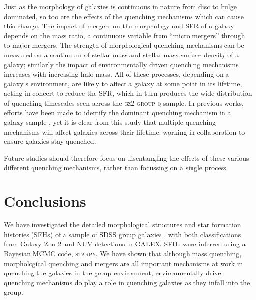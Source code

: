 \documentclass[useAMS,usenatbib]{mn2e}
\begin{document}
Just as the morphology of galaxies is continuous in nature from disc to bulge dominated, so too are the effects of the quenching mechanisms which can cause this change. The impact of mergers on the morphology and SFR of a galaxy depends on the mass ratio, a continuous variable from ``micro mergers'' \citep{beaton14, carlin16} through to major mergers. The strength of morphological quenching mechanisms can be measured on a continuum of stellar mass and stellar mass surface density of a galaxy; similarly the impact of environmentally driven quenching mechanisms increases with increasing halo mass. All of these processes, depending on a galaxy's environment, are likely to affect a galaxy at some point in its lifetime, acting in concert to reduce the SFR, which in turn produces the wide distribution of quenching timescales seen across the \textsc{gz2-group-q} sample. In previous works, efforts have been made to identify the dominant quenching mechanism in a galaxy sample \citep[e.g.][]{muzzin12, schawinski14, foltz15, woo15, balogh16, darvish16, huertascompany16}, yet it is clear from this study that multiple quenching mechanisms will affect galaxies across their lifetime, working in collaboration to ensure galaxies stay quenched. 

Future studies should therefore focus on disentangling the effects of these various different quenching mechanisms, rather than focussing on a single process. 

\section{Conclusions}\label{sec:conc}

We have investigated the detailed morphological structures and star formation histories (SFHs) of a sample of SDSS group galaxies \citep{berlind06}, with both classifications from Galaxy Zoo 2 and NUV detections in GALEX. SFHs were inferred using a Bayesian MCMC code, \textsc{starpy}. We have shown that although mass quenching, morphological quenching and mergers are all important mechanisms at work in quenching the galaxies in the group environment, environmentally driven quenching mechanisms do play a role in quenching galaxies as they infall into the group. 
\end{document}

